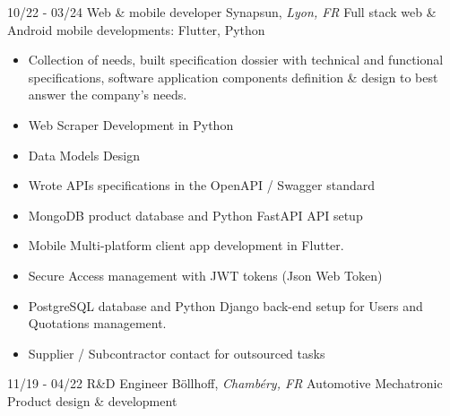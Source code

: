 \documentclass[]{friggeri-cv}
\begin{document}
\begin{entrylist}
  \entry
    {10/22 - 03/24}
    {Web \& mobile developer}
    {Synapsun, \textit{Lyon, FR}}
    {Full stack web \& Android mobile developments: \hspace*{8mm}Flutter, Python}
\end{entrylist}
\vspace{-15pt}

\vspace{0.5mm}
\begin{itemize}
\setlength{\itemsep}{1pt}
\setlength{\parskip}{0pt}
\setlength{\parsep}{0pt}

\item Collection of needs, built specification dossier with technical and functional specifications, software application components definition \& design to best answer the company's needs.
\item Web Scraper Development in Python
\item Data Models Design
\item Wrote APIs specifications in the OpenAPI / Swagger standard
\item MongoDB product database and Python FastAPI API setup
\item Mobile Multi-platform client app development in Flutter.
\item Secure Access management with JWT tokens (Json Web Token)
\item PostgreSQL database and Python Django back-end setup for Users and Quotations management.
\item Supplier / Subcontractor contact for outsourced tasks
\end{itemize}

\begin{entrylist}
  \entry
    {11/19 - 04/22}
    {R\&D Engineer}
    {Böllhoff, \textit{Chambéry, FR}}
    {Automotive Mechatronic Product design \& development}
\end{entrylist}
\vspace{-15pt}
\end{document}
